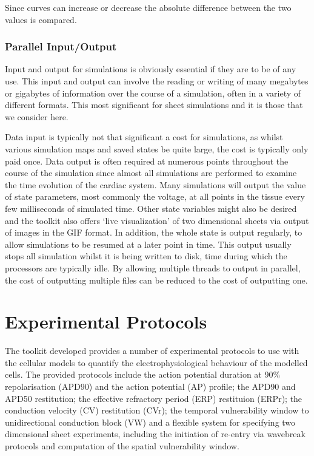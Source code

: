 Since curves can increase or decrease the absolute difference between the two
values is compared.

\subsubsection{Parallel Input/Output}

Input and output for simulations is obviously essential if they are to be of any
use.  This input and output can involve the reading or writing of many megabytes
or gigabytes of information over the course of a simulation, often in a variety
of different formats.  This most significant for sheet simulations and it is
those that we consider here.

Data input is typically not that significant a cost for
simulations, as whilst various simulation maps and saved states be quite large,
the cost is typically only paid once.  Data output is often required at numerous
points throughout the course of the simulation since almost all simulations are
performed to examine the time evolution of the cardiac system.  Many simulations
will output the value of state parameters, most commonly the voltage, at all
points in the tissue every few milliseconds of simulated time.  Other state
variables might also be desired and the toolkit also offers `live visualization'
of two dimensional sheets via output of images in the GIF format.  In addition,
the whole state is output regularly, to allow simulations to be resumed at a
later point in time.  This output usually stops all simulation whilst it is
being written to disk, time during which the processors are typically idle.  By
allowing multiple threads to output in parallel, the cost of outputting multiple
files can be reduced to the cost of outputting one.


\section{Experimental Protocols}

The toolkit developed provides a number of experimental protocols to use with
the cellular models to quantify the electrophysiological behaviour of the
modelled cells.  The provided protocols include the action potential duration at
90\% repolarisation (APD90) and the action potential (AP) profile; the
APD90 and APD50 restitution; the effective refractory period (ERP) restituion
(ERPr); the conduction velocity (CV) restitution (CVr); the temporal
vulnerability window to unidirectional conduction block (VW) and a flexible
system for specifying two dimensional sheet experiments, including the
initiation of re-entry via wavebreak protocols and computation of the spatial
vulnerability window.

